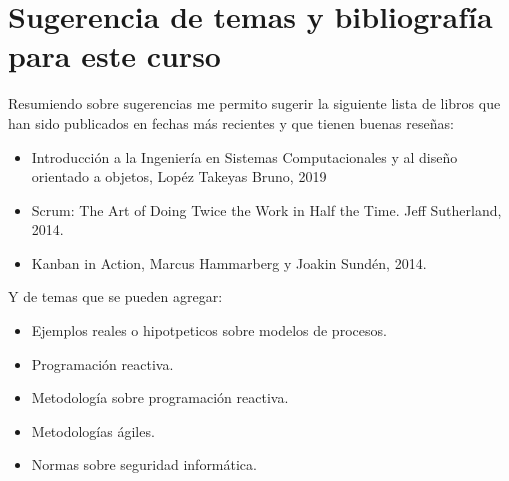 \documentclass[12pt,twoside]{article}
\begin{document}
\section{Sugerencia de temas y bibliografía para este curso}
Resumiendo sobre sugerencias me permito sugerir la siguiente lista de libros que han sido publicados en 
fechas más recientes y que tienen buenas reseñas:
\begin{itemize}
    \item Introducción a la Ingeniería en Sistemas Computacionales y al diseño orientado a objetos, 
    Lopéz Takeyas Bruno, 2019
    \item Scrum: The Art of Doing Twice the Work in Half the Time. Jeff Sutherland, 2014.
    \item Kanban in Action, Marcus Hammarberg y Joakin Sundén, 2014.
\end{itemize}


Y de temas que se pueden agregar:
\begin{itemize}
    \item Ejemplos reales o hipotpeticos sobre modelos de procesos.
    \item Programación reactiva.
    \item Metodología sobre programación reactiva.
    \item Metodologías ágiles.
    \item Normas sobre seguridad informática.
\end{itemize}
\end{document}
